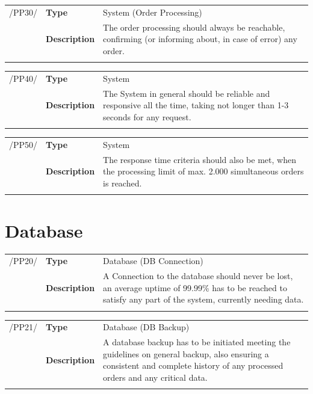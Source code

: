 \documentclass[11pt,a4paper,oneside,svgnames]{report}
\begin{document}
\noindent
\begin{tabular}{llp{10cm}}
\cellcolor{white}/PP30/	& \textbf{Type}			& System (Order Processing)\\
\cellcolor{white}		& \textbf{Description}	& The order processing should always be reachable, confirming (or informing about, in case of error) any order.\\
\cellcolor{white}		\hfill \\
\end{tabular}

\noindent
\begin{tabular}{llp{10cm}}
\cellcolor{white}/PP40/	& \textbf{Type}			& System\\
\cellcolor{white}		& \textbf{Description}	& The System in general should be reliable and responsive all the time, taking not longer than 1-3 seconds for any request.\\
\cellcolor{white}		\hfill \\
\end{tabular}

\noindent
\begin{tabular}{llp{10cm}}
\cellcolor{white}/PP50/	& \textbf{Type}			& System\\
\cellcolor{white}		& \textbf{Description}	& The response time criteria should also be met, when the processing limit of max. 2.000 simultaneous orders is reached.\\
\cellcolor{white}		\hfill \\
\end{tabular}

\section{Database}

\noindent
\begin{tabular}{llp{10cm}}
\cellcolor{white}/PP20/	& \textbf{Type}			& Database (DB Connection)\\
\cellcolor{white}		& \textbf{Description}	& A Connection to the database should never be lost, an average uptime of 99.99\% has to be reached to satisfy any part of the system, currently needing data.\\
\cellcolor{white}		\hfill \\
\end{tabular}

\noindent
\begin{tabular}{llp{10cm}}
\cellcolor{white}/PP21/	& \textbf{Type}			& Database (DB Backup)\\
\cellcolor{white}		& \textbf{Description}	& A database backup has to be initiated meeting the guidelines on general backup, also ensuring a consistent and complete history of any processed orders and any critical data.\\
\cellcolor{white}		\hfill \\
\end{tabular}
\end{document}
